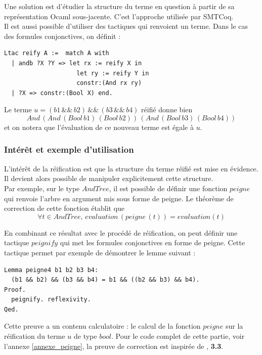 \documentclass[11pt]{article}
\begin{document}
Une solution est d'étudier la structure du terme en question à partir de sa représentation Ocaml sous-jacente. C'est l'approche utilisée par SMTCoq. \\

Il est aussi possible d'utiliser des tactiques qui renvoient un terme. Dans le cas des formules conjonctives, on définit :

\begin{lstlisting}[frame=single]
Ltac reify A :=  match A with
  | andb ?X ?Y => let rx := reify X in
                    let ry := reify Y in
                    constr:(And rx ry)
  | ?X => constr:(Bool X) end.

\end{lstlisting}

Le terme $u = (b1\,\&\&\,b2)\,\&\&\,(b3\,\&\&\,b4)$ réifié donne bien 
\[And\,(And\,(Bool\,b1)\,(Bool\,b2))\,(And\,(Bool\,b3)\,(Bool\,b4))\] 
et on notera que l'évaluation de ce nouveau terme est égale à $u$.



\subsubsection{Intérêt et exemple d'utilisation}

L'intérêt de la réification est que la structure du terme réifié est mise en évidence. Il devient alors possible de manipuler explicitement cette structure. \\

Par exemple, sur le type $AndTree$, il est possible de définir une fonction $peigne$ qui renvoie l'arbre en argument mis sous forme de peigne. Le théorème de correction de cette fonction établit que 
\[ \forall t \in AndTree, \, evaluation \, (peigne \, (t)) = evaluation (t) \]

En combinant ce résultat avec le procédé de réification, on peut définir une tactique $peignify$ qui met les formules conjonctives en forme de peigne. Cette tactique permet par exemple de démontrer le lemme suivant : 

\begin{lstlisting}[frame=single]
Lemma peigne4 b1 b2 b3 b4:
  (b1 && b2) && (b3 && b4) = b1 && ((b2 && b3) && b4).
Proof.
  peignify. reflexivity.
Qed.
\end{lstlisting}
Cette preuve a un contenu calculatoire : le calcul de la fonction $peigne$ sur la réification du terme $u$ de type $bool$. Pour le code complet de cette partie, voir l'annexe \ref{annexe_peigne}, la preuve de correction est inspirée de \cite{coq_intro}, \textbf{3.3}.
\end{document}
